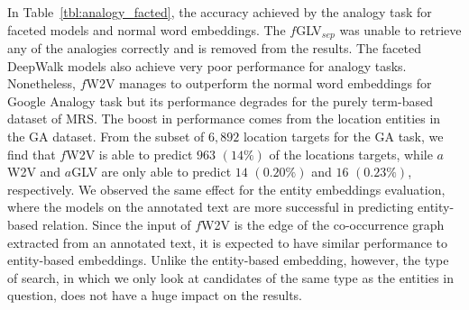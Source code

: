 In Table~\ref{tbl:analogy_facted}, the accuracy achieved by the analogy task for faceted models and normal word embeddings. The $f$GLV$_{sep}$ was unable to retrieve any of the analogies correctly and is removed from the results. The faceted DeepWalk models also achieve very poor performance for analogy tasks. Nonetheless, $f$W2V manages to outperform the normal word embeddings for Google Analogy task but its performance degrades for the purely term-based dataset of MRS. The boost in performance comes from the location entities in the GA dataset. From the subset of $6,892$ location targets for the GA task, we find that $f$W2V is able to predict $963$ $(14\%)$ of the locations targets, while $a$W2V and $a$GLV are only able to predict $14$ $(0.20\%)$ and $16$ $(0.23\%)$, respectively. We observed the same effect for the entity embeddings evaluation, where the models on the annotated text are more successful in predicting entity-based relation. Since the input of $f$W2V is the edge of the co-occurrence graph extracted from an annotated text, it is expected to have similar performance to entity-based embeddings. Unlike the entity-based embedding, however, the type of search, in which we only look at candidates of the same type as the entities in question, does not have a huge impact on the results. 

\begin{table}[t]
\caption{Word analogy results for faceted model . Shown is the prediction accuracy for the normal analogy tasks and the variation where predictions are limited to the correct entity type. The best two values per task and variation are highlighted.}
\label{tbl:analogy_facted}
\setlength{\tabcolsep}{8pt} %
\renewcommand{\arraystretch}{1.0} %
\end{table}

